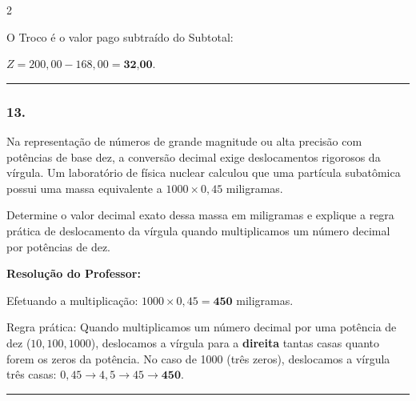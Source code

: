 \begin{multicols*}{2}
\begin{tcolorbox}[colback=CorTitUm!5, colframe=CorTitUm, boxrule=1pt, arc=4pt, left=6pt, right=6pt, top=6pt, bottom=6pt]
    O Troco é o valor pago subtraído do Subtotal:
    
    $Z = 200,00 - 168,00 = \textbf{32,00}$.
    \end{tcolorbox}
\fi

\par\vspace{\espacoQuestao}
\noindent\textcolor{CorLinha}{\rule{\linewidth}{0.5pt}} 
\par\vspace{\espacoPreQuestao}
\subsubsection*{13.} Na representação de números de grande magnitude ou alta precisão com potências de base dez, a conversão decimal exige deslocamentos rigorosos da vírgula. Um laboratório de física nuclear calculou que uma partícula subatômica possui uma massa equivalente a $ 1000 \times 0,45 $ miligramas.

Determine o valor decimal exato dessa massa em miligramas e explique a regra prática de deslocamento da vírgula quando multiplicamos um número decimal por potências de dez.

\ifgabarito
    \begin{tcolorbox}[colback=CorTitUm!5, colframe=CorTitUm, boxrule=1pt, arc=4pt, left=6pt, right=6pt, top=6pt, bottom=6pt]
    \small\textbf{\textcolor{CorTitUm}{Resolução do Professor:}}\par\vspace{0.1cm}
    \color{CinzaEscuro}
    Efetuando a multiplicação: $1000 \times 0,45 = \textbf{450}$ miligramas.
    
    Regra prática: Quando multiplicamos um número decimal por uma potência de dez ($10, 100, 1000$), deslocamos a vírgula para a \textbf{direita} tantas casas quanto forem os zeros da potência. No caso de 1000 (três zeros), deslocamos a vírgula três casas: $0,45 \rightarrow 4,5 \rightarrow 45 \rightarrow \textbf{450}$.
    \end{tcolorbox}
\fi

\par\vspace{\espacoQuestao}

\noindent\textcolor{CorLinha}{\rule{\linewidth}{0.5pt}} 
\par\vspace{\espacoPreQuestao}

\end{multicols*}
